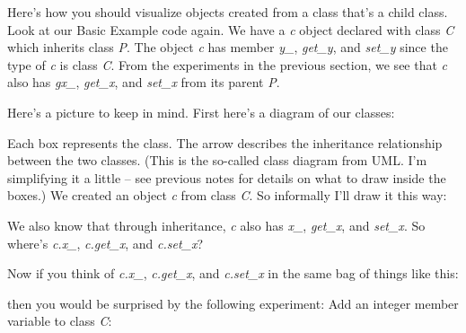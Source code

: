 \documentclass[
]{article}
\begin{document}
Here's how you should visualize objects created from a class that's a
child class. Look at our Basic Example code again. We have a \emph{c}
object declared with class \emph{C} which inherits class \emph{P}. The
object \emph{c} has member \emph{y\_}, \emph{get\_y}, and \emph{set\_y}
since the type of \emph{c} is class \emph{C}. From the experiments in
the previous section, we see that \emph{c} also has \emph{gx\_},
\emph{get\_x}, and \emph{set\_x} from its parent \emph{P}.

Here's a picture to keep in mind. First here's a diagram of our classes:

Each box represents the class. The arrow describes the inheritance
relationship between the two classes. (This is the so-called class
diagram from UML. I'm simplifying it a little -- see previous notes for
details on what to draw inside the boxes.) We created an object \emph{c}
from class \emph{C}. So informally I'll draw it this way:

We also know that through inheritance, \emph{c} also has \emph{x\_},
\emph{get\_x}, and \emph{set\_x}. So where's \emph{c.x\_},
\emph{c.get\_x}, and \emph{c.set\_x}?

Now if you think of \emph{c.x\_}, \emph{c.get\_x}, and \emph{c.set\_x}
in the same bag of things like this:

then you would be surprised by the following experiment: Add an integer
member variable to class \emph{C}:
\end{document}

